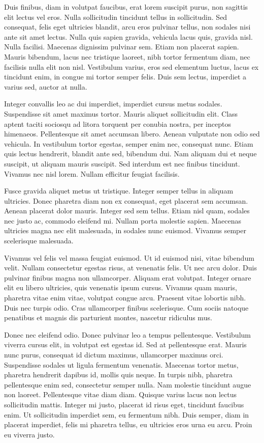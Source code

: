 \documentclass{llncs}
\begin{document}
Duis finibus, diam in volutpat faucibus, erat lorem suscipit purus, non sagittis elit lectus vel eros. Nulla sollicitudin tincidunt tellus in sollicitudin. Sed consequat, felis eget ultricies blandit, arcu eros pulvinar tellus, non sodales nisi ante sit amet lectus. Nulla quis sapien gravida, vehicula lacus quis, gravida nisl. Nulla facilisi. Maecenas dignissim pulvinar sem. Etiam non placerat sapien. Mauris bibendum, lacus nec tristique laoreet, nibh tortor fermentum diam, nec facilisis nulla elit non nisl. Vestibulum varius, eros sed elementum luctus, lacus ex tincidunt enim, in congue mi tortor semper felis. Duis sem lectus, imperdiet a varius sed, auctor at nulla.

Integer convallis leo ac dui imperdiet, imperdiet cursus metus sodales. Suspendisse sit amet maximus tortor. Mauris aliquet sollicitudin elit. Class aptent taciti sociosqu ad litora torquent per conubia nostra, per inceptos himenaeos. Pellentesque sit amet accumsan libero. Aenean vulputate non odio sed vehicula. In vestibulum tortor egestas, semper enim nec, consequat nunc. Etiam quis lectus hendrerit, blandit ante sed, bibendum dui. Nam aliquam dui et neque suscipit, ut aliquam mauris suscipit. Sed interdum est nec finibus tincidunt. Vivamus nec nisl lorem. Nullam efficitur feugiat facilisis.

Fusce gravida aliquet metus ut tristique. Integer semper tellus in aliquam ultricies. Donec pharetra diam non ex consequat, eget placerat sem accumsan. Aenean placerat dolor mauris. Integer sed sem tellus. Etiam nisl quam, sodales nec justo ac, commodo eleifend mi. Nullam porta molestie sapien. Maecenas ultricies magna nec elit malesuada, in sodales nunc euismod. Vivamus semper scelerisque malesuada.

Vivamus vel felis vel massa feugiat euismod. Ut id euismod nisi, vitae bibendum velit. Nullam consectetur egestas risus, at venenatis felis. Ut nec arcu dolor. Duis pulvinar finibus magna non ullamcorper. Aliquam erat volutpat. Integer ornare elit eu libero ultricies, quis venenatis ipsum cursus. Vivamus quam mauris, pharetra vitae enim vitae, volutpat congue arcu. Praesent vitae lobortis nibh. Duis nec turpis odio. Cras ullamcorper finibus scelerisque. Cum sociis natoque penatibus et magnis dis parturient montes, nascetur ridiculus mus.

Donec nec eleifend odio. Donec pulvinar leo a tempus pellentesque. Vestibulum viverra cursus elit, in volutpat est egestas id. Sed at pellentesque erat. Mauris nunc purus, consequat id dictum maximus, ullamcorper maximus orci. Suspendisse sodales ut ligula fermentum venenatis. Maecenas tortor metus, pharetra hendrerit dapibus id, mollis quis neque. In turpis nibh, pharetra pellentesque enim sed, consectetur semper nulla. Nam molestie tincidunt augue non laoreet. Pellentesque vitae diam diam. Quisque varius lacus non lectus sollicitudin mattis. Integer mi justo, placerat id risus eget, tincidunt faucibus enim. Ut sollicitudin imperdiet sem, eu fermentum nibh. Duis semper, diam in placerat imperdiet, felis mi pharetra tellus, eu ultricies eros urna eu arcu. Proin eu viverra justo.
\end{document}
